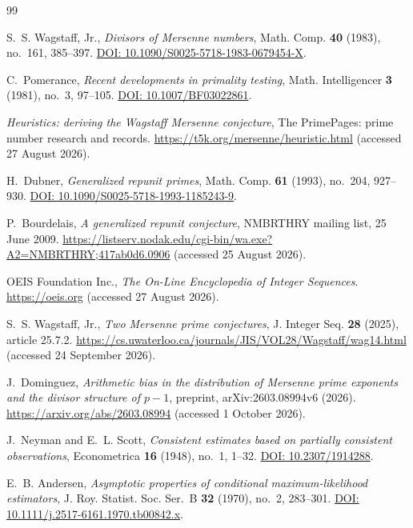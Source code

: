 \documentclass[11pt,a4paper]{article}
\theoremstyle{plain}
\theoremstyle{remark}
\begin{document}
\begin{thebibliography}{99}

 S.~S. Wagstaff, Jr., \emph{Divisors of Mersenne
numbers}, Math. Comp. \textbf{40} (1983), no.~161, 385--397.
\href{https://doi.org/10.1090/S0025-5718-1983-0679454-X}{DOI:
10.1090/S0025-5718-1983-0679454-X}.

 C.~Pomerance, \emph{Recent developments in primality
testing}, Math. Intelligencer \textbf{3} (1981), no.~3, 97--105.
\href{https://doi.org/10.1007/BF03022861}{DOI: 10.1007/BF03022861}.

 \emph{Heuristics: deriving the Wagstaff Mersenne conjecture}, The
PrimePages: prime number research and records.
\url{https://t5k.org/mersenne/heuristic.html} (accessed 27 August 2026).

 H.~Dubner, \emph{Generalized repunit primes}, Math. Comp.
\textbf{61} (1993), no.~204, 927--930.
\href{https://doi.org/10.1090/S0025-5718-1993-1185243-9}{DOI:
10.1090/S0025-5718-1993-1185243-9}.

 P.~Bourdelais, \emph{A generalized repunit
conjecture}, NMBRTHRY mailing list, 25 June 2009.
\url{https://listserv.nodak.edu/cgi-bin/wa.exe?A2=NMBRTHRY;417ab0d6.0906}
(accessed 25 August 2026).

 OEIS Foundation Inc., \emph{The On-Line Encyclopedia of Integer
Sequences}. \url{https://oeis.org} (accessed 27 August 2026).

 S.~S. Wagstaff, Jr., \emph{Two Mersenne prime
conjectures}, J. Integer Seq. \textbf{28} (2025), article 25.7.2.
\url{https://cs.uwaterloo.ca/journals/JIS/VOL28/Wagstaff/wag14.html}
(accessed 24 September 2026).

 J.~Dominguez, \emph{Arithmetic bias in the distribution
of Mersenne prime exponents and the divisor structure of $p-1$}, preprint,
arXiv:2603.08994v6 (2026). \url{https://arxiv.org/abs/2603.08994}
(accessed 1 October 2026).

 J.~Neyman and E.~L. Scott, \emph{Consistent estimates
based on partially consistent observations}, Econometrica \textbf{16} (1948),
no.~1, 1--32.
\href{https://doi.org/10.2307/1914288}{DOI: 10.2307/1914288}.

 E.~B. Andersen, \emph{Asymptotic properties of
conditional maximum-likelihood estimators}, J. Roy. Statist. Soc. Ser.~B
\textbf{32} (1970), no.~2, 283--301.
\href{https://doi.org/10.1111/j.2517-6161.1970.tb00842.x}{DOI:
10.1111/j.2517-6161.1970.tb00842.x}.


\end{thebibliography}
\end{document}
